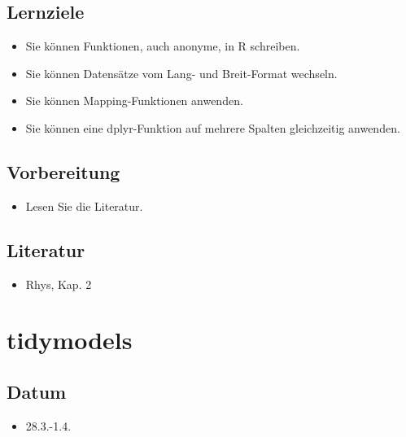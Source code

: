 \documentclass[
]{book}
\providecommand{\tightlist}{%
  \setlength{\itemsep}{0pt}\setlength{\parskip}{0pt}}
\begin{document}
\hypertarget{lernziele-2}{%
\subsection{Lernziele}\label{lernziele-2}}

\begin{itemize}
\tightlist
\item
  Sie können Funktionen, auch anonyme, in R schreiben.
\item
  Sie können Datensätze vom Lang- und Breit-Format wechseln.
\item
  Sie können Mapping-Funktionen anwenden.
\item
  Sie können eine dplyr-Funktion auf mehrere Spalten gleichzeitig anwenden.
\end{itemize}

\hypertarget{vorbereitung-1}{%
\subsection{Vorbereitung}\label{vorbereitung-1}}

\begin{itemize}
\tightlist
\item
  Lesen Sie die Literatur.
\end{itemize}

\hypertarget{literatur-2}{%
\subsection{Literatur}\label{literatur-2}}

\begin{itemize}
\tightlist
\item
  Rhys, Kap. 2
\end{itemize}

\hypertarget{tidymodels}{%
\section{tidymodels}\label{tidymodels}}

\hypertarget{datum-2}{%
\subsection{Datum}\label{datum-2}}

\begin{itemize}
\tightlist
\item
  28.3.-1.4.
\end{itemize}
\end{document}
